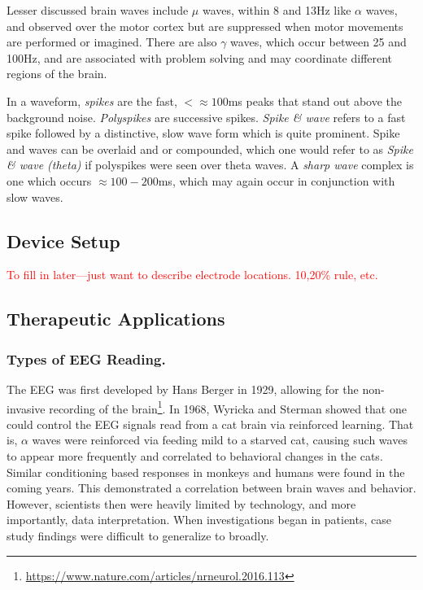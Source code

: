 Lesser discussed brain waves include $\mu$ waves, within 8 and 13Hz like $\alpha$ waves, and observed over the motor cortex but are suppressed when motor movements are performed or imagined. There are also $\gamma$ waves, which occur between 25 and 100Hz, and are associated with problem solving and may coordinate different regions of the brain.\newline

In a waveform, \textit{spikes} are the fast, $<\approx100$ms peaks that stand out above the background noise. \textit{Polyspikes} are successive spikes. \textit{Spike \& wave} refers to a fast spike followed by a distinctive, slow wave form which is quite prominent. Spike and waves can be overlaid and or compounded, which one would refer to as \textit{Spike \& wave (theta)} if polyspikes were seen over theta waves. A \textit{sharp wave} complex is one which occurs $\approx 100-200$ms, which may again occur in conjunction with slow waves. 

\subsection{Device Setup}

\textcolor{red}{To fill in later---just want to describe electrode locations. 10,20\% rule, etc. }


\subsection{Therapeutic Applications}

\subsubsection{Types of EEG Reading.}

The EEG was first developed by Hans Berger in 1929, allowing for the non-invasive recording of the brain\footnote{\url{https://www.nature.com/articles/nrneurol.2016.113}}. In 1968, Wyricka and Sterman showed that one could control the EEG signals read from a cat brain via reinforced learning. That is, $\alpha$ waves were reinforced via feeding mild to a starved cat, causing such waves to appear more frequently and correlated to behavioral changes in the cats. Similar conditioning based responses in monkeys and humans were found in the coming years. This demonstrated a correlation between brain waves and behavior. However, scientists then were heavily limited by technology, and more importantly, data interpretation. When investigations began in patients, case study findings were difficult to generalize to broadly. \newline

